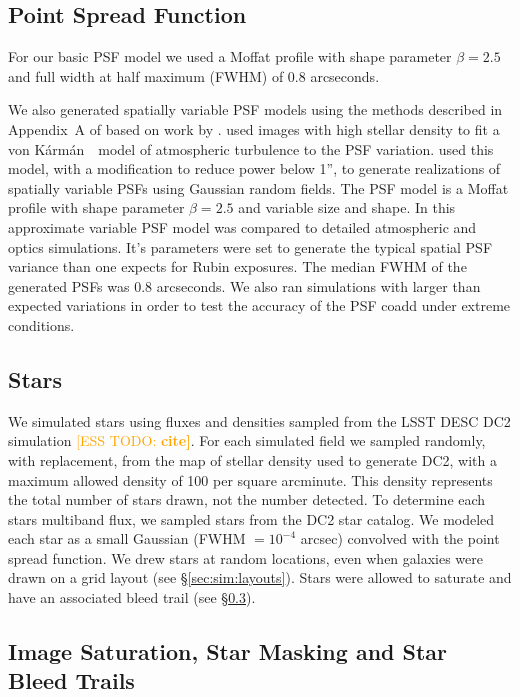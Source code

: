 \documentclass[twocolumn,twocolappendix,astrosym]{openjournal}
\newcommand{\esstodo}[1]{\textcolor{orange}{[ESS TODO: \bf #1]}}
\newcommand{\vonkarman}{{von K\'arm\'an}~}
\begin{document}
\subsection{Point Spread Function} \label{sec:sim:psfs}

For our basic PSF model we used a Moffat profile \citep{Moffat1969} with
shape parameter $\beta=2.5$ and full width at half maximum (FWHM) of 0.8 arcseconds.

We also generated spatially variable PSF models using the methods described in
Appendix~A of \citet{mdet20} based on work by \citet{heymans2012}.
\citet{heymans2012} used images with high stellar density to fit a \vonkarman\
model of atmospheric turbulence to the PSF variation. \citet{mdet20}
used this model, with a modification to reduce power below 1'', to generate
realizations of spatially variable PSFs using Gaussian random fields. The PSF
model is a Moffat \citep{Moffat1969} profile with shape parameter $\beta=2.5$
and variable size and shape. In \citet{mdet20} this approximate
variable PSF model was compared to detailed atmospheric and optics simulations.
It's parameters were set to generate the typical spatial PSF variance than one
expects for Rubin exposures. The median FWHM of the generated PSFs was 0.8
arcseconds.  We also ran simulations with larger than expected variations in
order to test the accuracy of the PSF coadd under extreme conditions.

\subsection{Stars} \label{sec:sim:stars}

We simulated stars using fluxes and densities sampled from the LSST DESC DC2
simulation \esstodo{cite}.  For each simulated field we sampled randomly, with
replacement, from the map of stellar density used to generate DC2, with a
maximum allowed density of 100 per square arcminute.  This density represents
the total number of stars drawn, not the number detected.  To determine each
stars multiband flux, we sampled stars from the DC2 star catalog.  We modeled
each star as a small Gaussian (FWHM $= 10^{-4}$ arcsec) convolved with the
point spread function.  We drew stars at random locations, even when galaxies
were drawn on a grid layout (see \S \ref{sec:sim:layouts}).  Stars were allowed
to saturate and have an associated bleed trail (see
\S \ref{sec:sim:satbleeds}).

\subsection{Image Saturation, Star Masking and Star Bleed Trails} \label{sec:sim:satbleeds}
\end{document}
